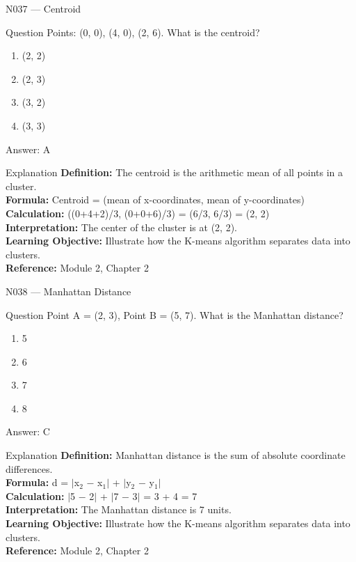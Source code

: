 \documentclass[aspectratio=169,8pt]{beamer}
\begin{document}
	\begin{frame}{N037 --- Centroid}
		\begin{block}{Question}
			Points: (0, 0), (4, 0), (2, 6). What is the centroid?
			\begin{enumerate}
				\item (2, 2)
				\item (2, 3)
				\item (3, 2)
				\item (3, 3)
			\end{enumerate}
		\end{block}
		\begin{exampleblock}{Answer: A}\end{exampleblock}
		\begin{block}{Explanation}
			\textbf{Definition:} The centroid is the arithmetic mean of all points in a cluster.\\
			\textbf{Formula:} Centroid = (mean of x-coordinates, mean of y-coordinates)\\
			\textbf{Calculation:} ((0+4+2)/3, (0+0+6)/3) = (6/3, 6/3) = (2, 2)\\
			\textbf{Interpretation:} The center of the cluster is at (2, 2).\\
			\textbf{Learning Objective:} Illustrate how the K-means algorithm separates data into clusters.\\
			\textbf{Reference:} Module 2, Chapter 2
		\end{block}
	\end{frame}
	
	\begin{frame}{N038 --- Manhattan Distance}
		\begin{block}{Question}
			Point A = (2, 3), Point B = (5, 7). What is the Manhattan distance?
			\begin{enumerate}
				\item 5
				\item 6
				\item 7
				\item 8
			\end{enumerate}
		\end{block}
		\begin{exampleblock}{Answer: C}\end{exampleblock}
		\begin{block}{Explanation}
			\textbf{Definition:} Manhattan distance is the sum of absolute coordinate differences.\\
			\textbf{Formula:} d = $|$x$_{2}$ $-$ x$_{1}$$|$ + $|$y$_{2}$ $-$ y$_{1}$$|$\\
			\textbf{Calculation:} $|$5 $-$ 2$|$ + $|$7 $-$ 3$|$ = 3 + 4 = 7\\
			\textbf{Interpretation:} The Manhattan distance is 7 units.\\
			\textbf{Learning Objective:} Illustrate how the K-means algorithm separates data into clusters.\\
			\textbf{Reference:} Module 2, Chapter 2
		\end{block}
	\end{frame}
	
\end{document}
